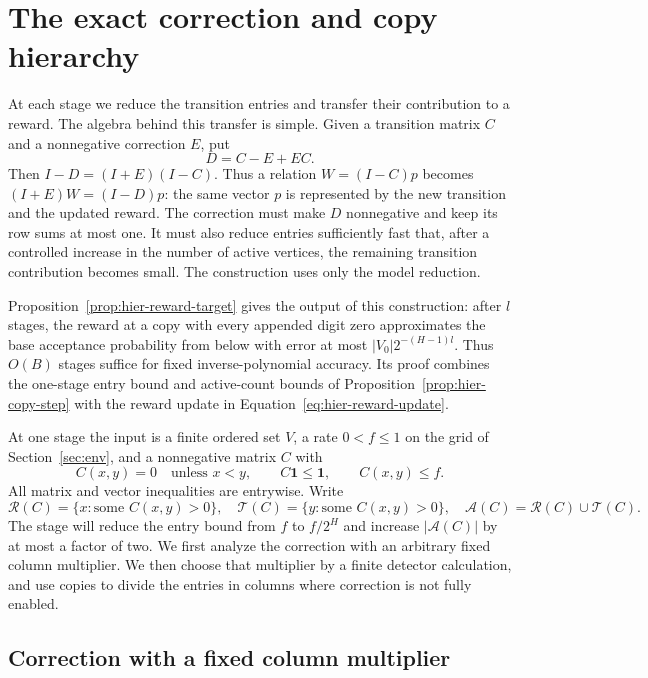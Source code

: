 \section{The exact correction and copy hierarchy}
\label{sec:hierarchy}

At each stage we reduce the transition entries and transfer their
contribution to a reward.  The algebra behind this transfer is simple. Given a transition
matrix $C$ and a nonnegative correction $E$, put
\[
 D=C-E+EC.
\]
Then $I-D=(I+E)(I-C)$. Thus a relation $W=(I-C)p$ becomes
$(I+E)W=(I-D)p$: the same vector $p$ is represented by the new transition
and the updated reward. The correction must make $D$ nonnegative and keep
its row sums at most one. It must also reduce entries sufficiently fast
that, after a controlled increase in the number of active vertices, the
remaining transition contribution becomes small.  The construction uses
only the model reduction.

Proposition~\ref{prop:hier-reward-target} gives the output of this
construction: after $l$ stages, the reward at a copy with every appended digit zero
approximates the base acceptance probability from below with error at
most $|V_0|2^{-(H-1)l}$. Thus $O(B)$ stages suffice for fixed
inverse-polynomial accuracy. Its proof combines the one-stage entry bound
and active-count bounds of Proposition~\ref{prop:hier-copy-step} with
the reward update in Equation~\eqref{eq:hier-reward-update}.

At one stage the input is a finite ordered set $V$, a rate $0<f\le1$
on the grid of Section~\ref{sec:env}, and a nonnegative matrix $C$ with
\begin{equation}
 C(x,y)=0\quad\text{unless }x<y,\qquad
 C\mathbf1\le\mathbf1,\qquad C(x,y)\le f.
 \label{eq:hier-input}
\end{equation}
All matrix and vector inequalities are entrywise. Write
\[
 \mathcal R(C)=\{x:\text{some }C(x,y)>0\},\quad
 \mathcal T(C)=\{y:\text{some }C(x,y)>0\},\quad
 \mathcal A(C)=\mathcal R(C)\cup\mathcal T(C).
\]
The stage will reduce the entry bound from $f$ to $f/2^H$ and increase
$|\mathcal A(C)|$ by at most a factor of two. We first analyze the
correction with an arbitrary fixed column multiplier. We then choose that
multiplier by a finite detector calculation, and use copies to divide the
entries in columns where correction is not fully enabled.

\subsection{Correction with a fixed column multiplier}

